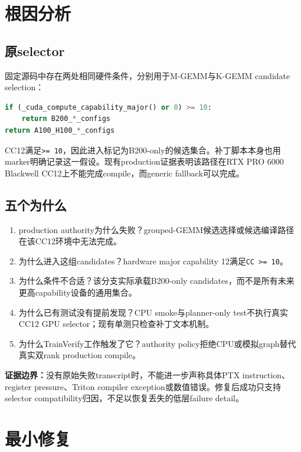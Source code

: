 \documentclass[10.5pt,a4paper]{ctexart}
\newcommand{\boundary}[1]{\par\smallskip\noindent\colorbox{soft}{\parbox{0.95\linewidth}{\textbf{证据边界：}#1}}\par\smallskip}
\begin{document}
\section{根因分析}

\subsection{原selector}

固定源码中存在两处相同硬件条件，分别用于M-GEMM与K-GEMM candidate selection：
\begin{lstlisting}[language=Python]
if (_cuda_compute_capability_major() or 0) >= 10:
    return B200_*_configs
return A100_H100_*_configs
\end{lstlisting}

CC12满足\texttt{>= 10}，因此进入标记为B200-only的候选集合。补丁脚本本身也用marker明确记录这一假设。现有production证据表明该路径在RTX PRO 6000 Blackwell CC12上不能完成compile，而generic fallback可以完成。

\subsection{五个为什么}

\begin{enumerate}
  \item production authority为什么失败？grouped-GEMM候选选择或候选编译路径在该CC12环境中无法完成。
  \item 为什么进入这组candidates？hardware major capability 12满足\texttt{CC >= 10}。
  \item 为什么条件不合适？该分支实际承载B200-only candidates，而不是所有未来更高capability设备的通用集合。
  \item 为什么已有测试没有提前发现？CPU smoke与planner-only test不执行真实CC12 GPU selector；现有单测只检查补丁文本机制。
  \item 为什么TrainVerify工作触发了它？authority policy拒绝CPU或模拟graph替代真实双rank production compile。
\end{enumerate}

\boundary{没有原始失败transcript时，不能进一步声称具体PTX instruction、register pressure、Triton compiler exception或数值错误。修复后成功只支持selector compatibility归因，不足以恢复丢失的低层failure detail。}

\section{最小修复}
\end{document}
